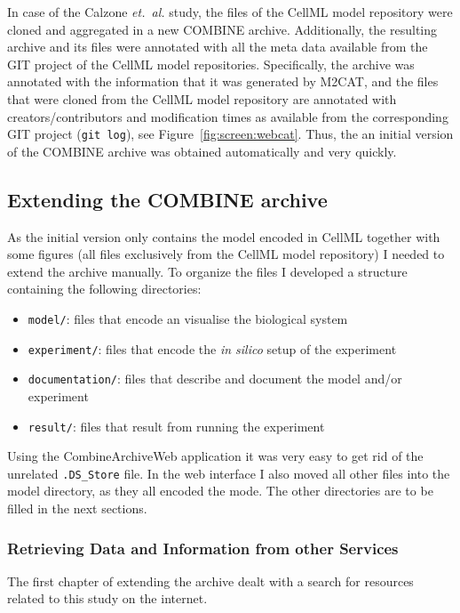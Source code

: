 In case of the Calzone \emph{et.~al.} study, the files of the CellML model repository were cloned and aggregated in a new COMBINE archive.
Additionally, the resulting archive and its files were annotated with all the meta data available from the GIT project of the CellML model repositories.
Specifically, the archive was annotated with the information that it was generated by M2CAT, and the files that were cloned from the CellML model repository are annotated with creators/contributors and modification times as available from the corresponding GIT project (\texttt{git log}), see Figure~\ref{fig:screen:webcat}. Thus, the an initial version of the COMBINE archive was obtained automatically and very quickly.






\subsection{Extending the COMBINE archive}
\label{sec:extendingarchive}
As the initial version only contains the model encoded in CellML together with some figures (all files exclusively from the CellML model repository) I needed to extend the archive manually.
To organize the files I developed a structure containing the following directories:
\begin{itemize}
 \item \texttt{model/}: files that encode an visualise the biological system
 \item \texttt{experiment/}: files that encode the \textit{in silico} setup of the experiment
 \item \texttt{documentation/}: files that describe and document the model and/or experiment
 \item \texttt{result/}: files that result from running the experiment
\end{itemize}

Using the CombineArchiveWeb application it was very easy to get rid of the unrelated \texttt{.DS\_Store} file. In the web interface I also moved all other files into the model directory, as they all encoded the mode.
The other directories are to be filled in the next sections.

\subsubsection{Retrieving Data and Information from other Services}
The first chapter of extending the archive dealt with a search for resources related to this study on the internet.

